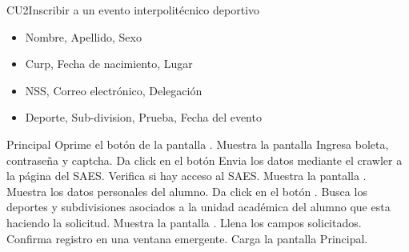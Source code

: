 \begin{UseCase}{CU2}{Inscribir a un evento interpolitécnico deportivo}
{\begin{itemize}
        	\item Nombre, Apellido, Sexo
        	\item Curp, Fecha de nacimiento, Lugar
        	\item NSS, Correo electrónico, Delegación
        	\item Deporte, Sub-division, Prueba, Fecha del evento
        \end{itemize}}
		\end{UseCase}
    \begin{UCtrayectoria}{Principal}
    \UCpaso[\UCactor] Oprime el botón  de la pantalla .\label{CU3_inicio}
    \UCpaso Muestra la pantalla \label{CU3_regresa}
    \UCpaso[\UCactor] Ingresa boleta, contraseña y captcha.
    \UCpaso[\UCactor] Da click en el botón 
    \UCpaso Envia los datos mediante el crawler a la página del SAES.
    \UCpaso Verifica si hay acceso al SAES.  
    \UCpaso Muestra la pantalla .
    \UCpaso Muestra los datos personales del alumno.
	\UCpaso[\UCactor] Da click en el botón . 
	\UCpaso Busca los deportes y subdivisiones asociados a la unidad académica del alumno que esta haciendo la solicitud.
	\UCpaso Muestra la pantalla . \label{CU3_deporte}
	\UCpaso[\UCactor] Llena los campos solicitados. 
    \UCpaso Confirma registro en una ventana emergente.
    \UCpaso Carga la pantalla Principal.
    \end{UCtrayectoria}
    
